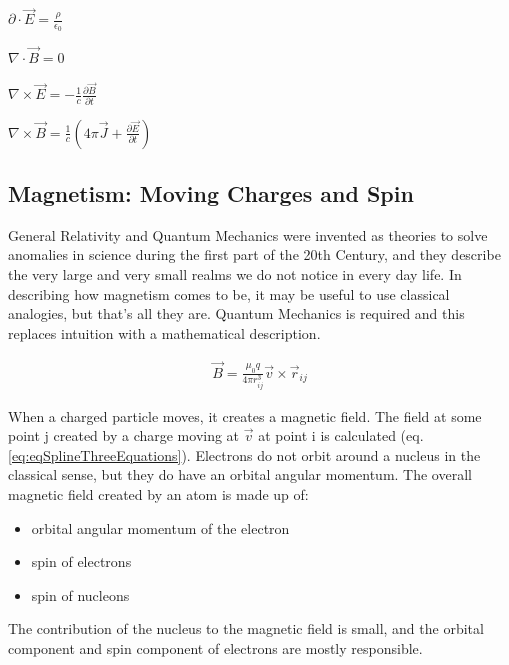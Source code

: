 $\partial \cdot \vec{E} = \frac{\rho}{\epsilon_0}$

$\nabla \cdot \vec{B} = 0$

$\nabla \times \vec{E} = -\frac{1}{c} \frac{\partial\vec{B}}{\partial t}$

$\nabla \times \vec{B} = \frac{1}{c}\left(4 \pi \vec{J} + \frac{\partial \vec{E}}{\partial t}\right)$



\subsection{Magnetism: Moving Charges and Spin}

General Relativity and Quantum Mechanics were invented as theories to solve anomalies in science during the first part of the 20th Century, and they describe the very large and very small realms we do not notice in every day life.  In describing how magnetism comes to be, it may be useful to use classical analogies, but that's all they are.  Quantum Mechanics is required and this replaces intuition with a mathematical description.

\begin{equation}
\begin{split}
\vec{B} = \frac{\mu_0 q}{4 \pi r_{ij}^3} \vec{v} \times \vec{r}_{ij}
\end{split}
\label{eq:eqSplineThreeEquations}
\end{equation}

When a charged particle moves, it creates a magnetic field.  The field at some point j created by a charge moving at $\vec{v}$ at point i is calculated (eq. \ref{eq:eqSplineThreeEquations}).  Electrons do not orbit around a nucleus in the classical sense, but they do have an orbital angular momentum.  The overall magnetic field created by an atom is made up of:

\begin{itemize}
  \item orbital angular momentum of the electron
  \item spin of electrons
  \item spin of nucleons 
\end{itemize}

The contribution of the nucleus to the magnetic field is small, and the orbital component and spin component of electrons are mostly responsible.


